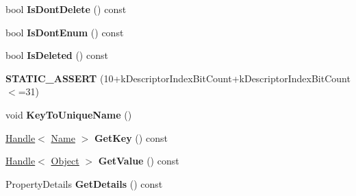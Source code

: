 \begin{DoxyCompactItemize}
\item 
\hypertarget{classv8_1_1internal_1_1_b_a_s_e___e_m_b_e_d_d_e_d_ab8fa05349dbf543ba826f71e9d7ff540}{}bool {\bfseries Is\+Dont\+Delete} () const \label{classv8_1_1internal_1_1_b_a_s_e___e_m_b_e_d_d_e_d_ab8fa05349dbf543ba826f71e9d7ff540}

\item 
\hypertarget{classv8_1_1internal_1_1_b_a_s_e___e_m_b_e_d_d_e_d_a14dfbdfd2e852ed211038d1fb5ed2d7f}{}bool {\bfseries Is\+Dont\+Enum} () const \label{classv8_1_1internal_1_1_b_a_s_e___e_m_b_e_d_d_e_d_a14dfbdfd2e852ed211038d1fb5ed2d7f}

\item 
\hypertarget{classv8_1_1internal_1_1_b_a_s_e___e_m_b_e_d_d_e_d_abfabeaa60f39faf2cbb13921f70e30ef}{}bool {\bfseries Is\+Deleted} () const \label{classv8_1_1internal_1_1_b_a_s_e___e_m_b_e_d_d_e_d_abfabeaa60f39faf2cbb13921f70e30ef}

\item 
\hypertarget{classv8_1_1internal_1_1_b_a_s_e___e_m_b_e_d_d_e_d_adaf71753674e998b97f0f87c9e6dadc7}{}{\bfseries S\+T\+A\+T\+I\+C\+\_\+\+A\+S\+S\+E\+R\+T} (10+k\+Descriptor\+Index\+Bit\+Count+k\+Descriptor\+Index\+Bit\+Count$<$=31)\label{classv8_1_1internal_1_1_b_a_s_e___e_m_b_e_d_d_e_d_adaf71753674e998b97f0f87c9e6dadc7}

\item 
\hypertarget{classv8_1_1internal_1_1_b_a_s_e___e_m_b_e_d_d_e_d_a814e9d5938ad316d3a5574b5ecf4313f}{}void {\bfseries Key\+To\+Unique\+Name} ()\label{classv8_1_1internal_1_1_b_a_s_e___e_m_b_e_d_d_e_d_a814e9d5938ad316d3a5574b5ecf4313f}

\item 
\hypertarget{classv8_1_1internal_1_1_b_a_s_e___e_m_b_e_d_d_e_d_ab17aa290f4df064c367566c54d6488a9}{}\hyperlink{classv8_1_1internal_1_1_handle}{Handle}$<$ \hyperlink{classv8_1_1internal_1_1_name}{Name} $>$ {\bfseries Get\+Key} () const \label{classv8_1_1internal_1_1_b_a_s_e___e_m_b_e_d_d_e_d_ab17aa290f4df064c367566c54d6488a9}

\item 
\hypertarget{classv8_1_1internal_1_1_b_a_s_e___e_m_b_e_d_d_e_d_ab2dd9b80d9dd1a4ede1271fcb79f0a30}{}\hyperlink{classv8_1_1internal_1_1_handle}{Handle}$<$ \hyperlink{classv8_1_1internal_1_1_object}{Object} $>$ {\bfseries Get\+Value} () const \label{classv8_1_1internal_1_1_b_a_s_e___e_m_b_e_d_d_e_d_ab2dd9b80d9dd1a4ede1271fcb79f0a30}

\item 
\hypertarget{classv8_1_1internal_1_1_b_a_s_e___e_m_b_e_d_d_e_d_a282ab8816d1168d35d089a58eef508ee}{}Property\+Details {\bfseries Get\+Details} () const \label{classv8_1_1internal_1_1_b_a_s_e___e_m_b_e_d_d_e_d_a282ab8816d1168d35d089a58eef508ee}


\end{DoxyCompactItemize}
